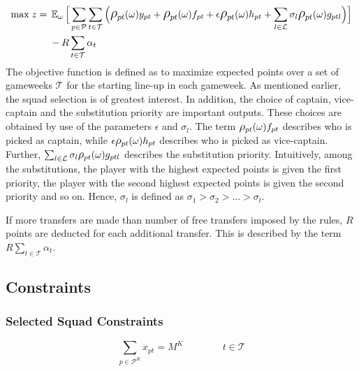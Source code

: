\begin{equation}
\smaller
\begin{aligned}
\text{max} \; z ={} 
& \EX_{\omega} \Big\lbrack\sum\limits_{p \in \mathcal{P}} \sum\limits_{t \in \mathcal{T}} \Big( \mathlarger{\rho}_{pt}(\omega)y_{pt} + \mathlarger{\rho}_{pt}(\omega)f_{pt} + \epsilon  \mathlarger{\rho}_{pt}(\omega)h_{pt} + \sum_{l \in \mathcal{L}}\sigma_{l} \mathlarger{\rho}_{pt}(\omega)g_{ptl} \Big)  \Big\rbrack \\
& - R\sum_{t \in \mathcal{T}}\alpha_{t}
\end{aligned}
\end{equation}
\newpar
The objective function is defined as to maximize expected points over a set of gameweeks $\mathcal{T}$ for the starting line-up in each gameweek. As mentioned earlier, the squad selection is of greatest interest. In addition, the choice of captain, vice-captain and the substitution priority are important outputs. These choices are obtained by use of the parameters $\epsilon$ and  $\sigma_{l}$. The term $\mathlarger{\rho}_{pt}(\omega)f_{pt}$ describes who is picked as captain, while $\epsilon \mathlarger{\rho}_{pt}(\omega)h_{pt}$ describes who is picked as vice-captain. Further, $\sum_{l \in \mathcal{L}}\sigma_{l} \mathlarger{\rho}_{pt}(\omega)g_{ptl}$ describes the substitution priority. Intuitively, among the substitutions, the player with the highest expected points is given the first priority, the player with the second highest expected points is given the second priority and so on. Hence, $\sigma_{l}$ is defined as $\sigma_{1} > \sigma_{2} > \ldots > \sigma_{l}$. 

\newpar

If more transfers are made than number of free transfers  imposed by the rules, $R$ points are deducted for each additional transfer. This is described by the term $R\sum_{t \in \mathcal{T}}\alpha_{t}$. 


\subsection{Constraints}

\subsubsection{Selected Squad Constraints} \label{team_sel}
\begin{equation} \label{eq:sel_keeper}
    \sum_{p \in \mathcal{P}^{K}} x_{pt} = M^{K} \qquad\qquad t \in \mathcal{T}
\end{equation}

